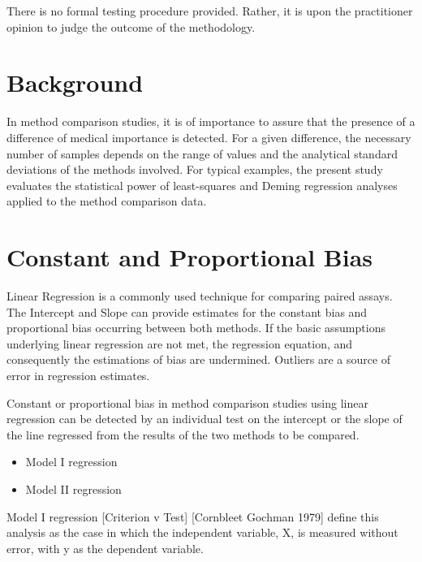 \documentclass[12pt, a4paper]{report}
\theoremstyle{plain}
\theoremstyle{definition}
\theoremstyle{remark}
\begin{document}
There is no formal testing procedure provided. Rather, it is upon
the practitioner opinion to judge the outcome of the methodology.








\section{Background} 
In method comparison studies, it is of importance to assure that the presence of a difference of medical importance is detected. 
For a given difference, the necessary number of samples depends on the range of values and the analytical standard deviations of the methods involved. For typical examples, the present study evaluates the statistical power of least-squares and Deming regression analyses applied to the method comparison data.

\section{Constant and Proportional Bias}

Linear Regression is a commonly used technique for comparing paired assays. The Intercept and Slope can provide estimates for the constant bias and proportional bias occurring between both methods. If the basic assumptions underlying linear regression are not met, the regression equation, and consequently the estimations
of bias are undermined. Outliers are a source of error in regression estimates.

Constant or proportional bias in method comparison studies using linear regression can be detected by an individual test on the intercept or the slope of the line regressed from the results of the two methods to be compared.

\begin{itemize}
	\item Model I regression
	\item Model II regression
\end{itemize}
Model I regression [Criterion v Test]
[Cornbleet Gochman 1979] define this analysis as the case in which the independent variable, X, is measured without error, with y as the dependent variable.
\end{document}
